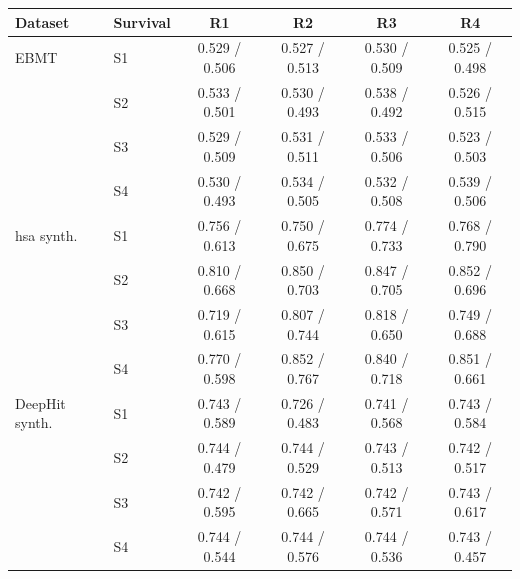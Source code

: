 \begin{tabular}{llcccc}
\toprule
Dataset & Survival & R1 & R2 & R3 & R4 \\
\midrule
EBMT & S1 & 0.529 / 0.506 & 0.527 / 0.513 & 0.530 / 0.509 & 0.525 / 0.498 \\
 & S2 & 0.533 / 0.501 & 0.530 / 0.493 & 0.538 / 0.492 & 0.526 / 0.515 \\
 & S3 & 0.529 / 0.509 & 0.531 / 0.511 & 0.533 / 0.506 & 0.523 / 0.503 \\
 & S4 & 0.530 / 0.493 & 0.534 / 0.505 & 0.532 / 0.508 & 0.539 / 0.506 \\
\midrule
hsa synth. & S1 & 0.756 / 0.613 & 0.750 / 0.675 & 0.774 / 0.733 & 0.768 / 0.790 \\
 & S2 & 0.810 / 0.668 & 0.850 / 0.703 & 0.847 / 0.705 & 0.852 / 0.696 \\
 & S3 & 0.719 / 0.615 & 0.807 / 0.744 & 0.818 / 0.650 & 0.749 / 0.688 \\
 & S4 & 0.770 / 0.598 & 0.852 / 0.767 & 0.840 / 0.718 & 0.851 / 0.661 \\
\midrule
DeepHit synth. & S1 & 0.743 / 0.589 & 0.726 / 0.483 & 0.741 / 0.568 & 0.743 / 0.584 \\
 & S2 & 0.744 / 0.479 & 0.744 / 0.529 & 0.743 / 0.513 & 0.742 / 0.517 \\
 & S3 & 0.742 / 0.595 & 0.742 / 0.665 & 0.742 / 0.571 & 0.743 / 0.617 \\
 & S4 & 0.744 / 0.544 & 0.744 / 0.576 & 0.744 / 0.536 & 0.743 / 0.457 \\
\bottomrule
\end{tabular}
